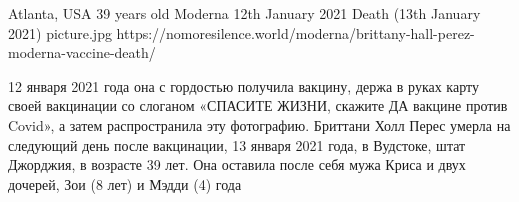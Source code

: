 {Atlanta, USA}
{39 years old}
{Moderna}
{12th January 2021}
{Death (13th January 2021)}
{picture.jpg}
{https://nomoresilence.world/moderna/brittany-hall-perez-moderna-vaccine-death/}
{

12 января 2021 года она с гордостью получила вакцину, держа в руках карту своей
вакцинации со слоганом «СПАСИТЕ ЖИЗНИ, скажите ДА вакцине против Covid», а затем
распространила эту фотографию. Бриттани Холл Перес умерла на следующий день
после вакцинации, 13 января 2021 года, в Вудстоке, штат Джорджия, в возрасте 39
лет. Она оставила после себя мужа Криса и двух дочерей, Зои (8 лет) и Мэдди (4)
года

}

